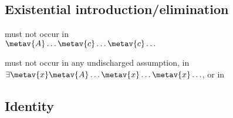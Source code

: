 \subsection*{Existential introduction/elimination}
\begin{multicols}{2}
\begin{fitchproof}
\end{fitchproof}

\noindent {} must not occur in\\ $\metav{A}\ldots \metav{c} \ldots \metav{c}\ldots$

\begin{fitchproof}
	\open	
	\close
\end{fitchproof}

\noindent {} must not occur in any undischarged assumption, in $\exists \metav{x}\metav{A}\ldots \metav{x} \ldots \metav{x}\ldots$, or in 
\end{multicols}

\subsection*{Identity}

\begin{fitchproof}
	 
\end{fitchproof}
\begin{multicols}{2}
\begin{fitchproof}
	 
\end{fitchproof}

\begin{fitchproof}
	 
\end{fitchproof}
\end{multicols}

